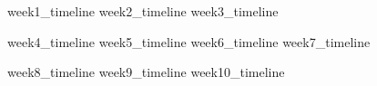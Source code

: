 \documentclass[11pt, a4paper, twoside]{article}
\date{\the\year}
\begin{document}





\clearpage
\thispagestyle{empty}
\hbox{}
\clearpage

\tableofcontents
\markboth{}{}

\cleardoublepage
{}

{week1_timeline}
{week2_timeline}
{week3_timeline}

\clearpage

{week4_timeline}
{week5_timeline}
{week6_timeline}
{week7_timeline}

\clearpage

{week8_timeline}
{week9_timeline}
{week10_timeline}
\end{document}
